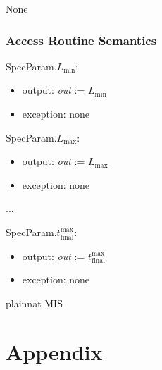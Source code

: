 \documentclass[12pt, titlepage]{article}
\begin{document}
None

\subsubsection{Access Routine Semantics}

\noindent SpecParam.$L_\text{min}$:
\begin{itemize}
\item output: \textit{out} := $L_\text{min}$
\item exception: none
\end{itemize}

\noindent SpecParam.$L_\text{max}$:
\begin{itemize}
\item output: \textit{out} := $L_\text{max}$
\item exception: none
\end{itemize}

...
~\newline

\noindent SpecParam.$t_{\text{final}}^{\text{max}}$:
\begin{itemize}
\item output: \textit{out} := $t_{\text{final}}^{\text{max}}$
\item exception: none
\end{itemize}

\newpage

 {plainnat}
 {MIS}

\newpage

\section{Appendix} \label{Appendix}

\renewcommand{\arraystretch}{1.2}
\end{document}
